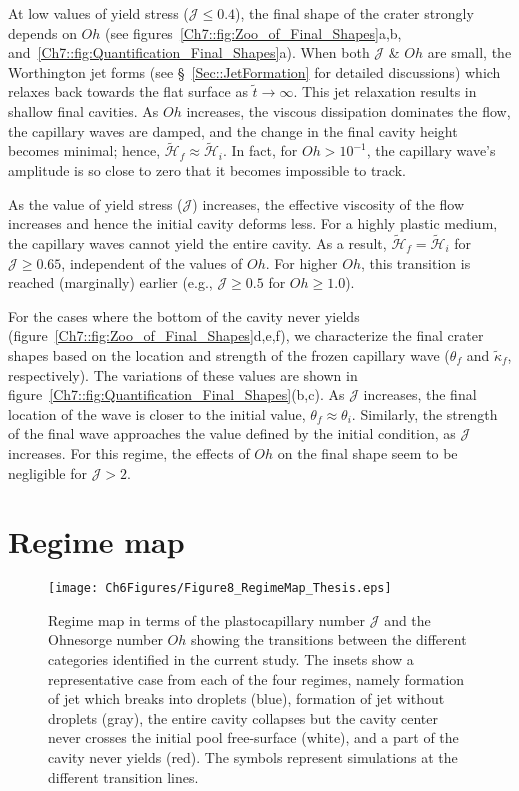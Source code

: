 At low values of yield stress ($\mathcal{J} \le 0.4$), the final shape of the crater strongly depends on $Oh$ (see figures~\ref{Ch7::fig:Zoo_of_Final_Shapes}a,b, and~\ref{Ch7::fig:Quantification_Final_Shapes}a).
When both $\mathcal{J}$ \& $Oh$ are small, the Worthington jet forms (see \S~\ref{Sec::JetFormation} for detailed discussions) which relaxes back towards the flat surface as $\tilde t \to \infty$. This jet relaxation results in shallow final cavities.
As $Oh$ increases, the viscous dissipation dominates the flow, the capillary waves are damped, and the change in the final cavity height becomes minimal; hence, $\tilde{\mathcal{H}}_f \approx \tilde{\mathcal{H}}_i$. In fact, for $Oh > 10^{-1}$, the capillary wave's amplitude is so close to zero that it becomes impossible to track.

As the value of yield stress ($\mathcal{J}$) increases, the effective viscosity of the flow increases and hence the initial cavity deforms less. For a highly plastic medium, the capillary waves cannot yield the entire cavity. As a result, $\tilde{\mathcal{H}}_f = \tilde{\mathcal{H}}_i$ for $\mathcal{J} \ge 0.65$, independent of the values of $Oh$. For higher $Oh$, this transition is reached (marginally) earlier (e.g., $\mathcal{J} \ge 0.5$ for $Oh \ge 1.0$).

For the cases where the bottom of the cavity never yields (figure~\ref{Ch7::fig:Zoo_of_Final_Shapes}d,e,f), we characterize the final crater shapes based on the location and strength of the frozen capillary wave ($\theta_f$ and $\tilde \kappa_f$, respectively). The variations of these values are shown in figure~\ref{Ch7::fig:Quantification_Final_Shapes}(b,c). As $\mathcal{J}$ increases, the final location of the wave is closer to the initial value, $\theta_f \approx \theta_i$. Similarly, the strength of the final wave approaches the value defined by the initial condition, as $\mathcal{J}$ increases. For this regime, the effects of $Oh$ on the final shape seem to be negligible for $\mathcal{J} > 2$. 

\section{Regime map}\label{Sec::RegimeMaps}

\begin{figure}
	\centering
	\texttt{[image: Ch6Figures/Figure8\_RegimeMap\_Thesis.eps]}
	\caption{Regime map in terms of the plastocapillary number $\mathcal{J}$ and the Ohnesorge number $Oh$ showing the transitions between the different categories identified in the current study. The insets show a representative case from each of the four regimes, namely formation of jet which breaks into droplets (blue), formation of jet without droplets (gray), the entire cavity collapses but the cavity center never crosses the initial pool free-surface (white), and a part of the cavity never yields (red). The symbols represent simulations at the different transition lines.}
	\label{Ch7::fig:Regime_Map}
\end{figure}

